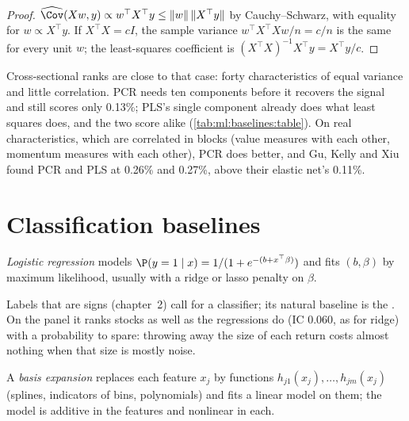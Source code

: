 \begin{proof}
$\widehat{\Cov}(Xw, y)\propto w^\top X^\top y \le \lVert w\rVert\,\lVert X^\top y\rVert$ by Cauchy--Schwarz, with equality
for $w\propto X^\top y$. If $X^\top X = cI$, the sample variance $w^\top X^\top Xw/n = c/n$ is the same for every unit $w$;
the least-squares coefficient is $(X^\top X)^{-1}X^\top y = X^\top y/c$.
\end{proof}

Cross-sectional ranks are close to that case: forty characteristics of equal variance and little correlation. PCR needs
ten components before it recovers the signal and still scores only 0.13\%; PLS's single component already does what
least squares does, and the two score alike (\cref{tab:ml:baselines:table}). On real characteristics, which are
correlated in blocks (value measures with each other, momentum measures with each other), PCR does better, and Gu,
Kelly and Xiu found PCR and PLS at 0.26\% and 0.27\%, above their elastic net's 0.11\%.

\section{Classification baselines}

\begin{definition}\label{def:ml:linear-and-regularised-baselines:logistic}
\emph{Logistic regression} models $\P(y = 1\mid x) = 1/(1 + e^{-(b + x^\top\beta)})$ and fits
$(b,\beta)$ by maximum likelihood, usually with a ridge or lasso penalty on $\beta$.
\end{definition}

Labels that are signs (chapter~2) call for a classifier; its natural baseline is the . On the panel it
ranks stocks as well as the regressions do (IC 0.060, as for ridge) with a probability to spare: throwing away
the size of each return costs almost nothing when that size is mostly noise.

\begin{definition}\label{def:ml:linear-and-regularised-baselines:basis}
A \emph{basis expansion} replaces each feature $x_j$ by functions $h_{j1}(x_j),\dots,h_{jm}(x_j)$
(splines, indicators of bins, polynomials) and fits a linear model on them; the model is additive in the features and
nonlinear in each.
\end{definition}

